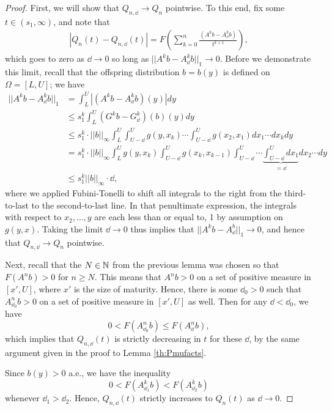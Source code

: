 \begin{proof}
	First, we will show that $Q_{n, \dd} \to Q_n$ pointwise. To this end, fix some $t \in (s_1, \infty)$, and note that
	\begin{align*}
		|Q_n(t) - Q_{n, \dd}(t)| = F \left( \sum_{k=0}^n \frac{(A^k b - A_\dd^k b)}{t^{k + 1}} \right),
	\end{align*}
	which goes to zero  as $\dd \to 0$ so long as $||A^k b - A_\dd^k b||_1 \to 0$. Before we demonstrate this limit, recall that the offspring distribution $b = b(y)$ is defined on $\Omega = [L, U]$; we have
	\begin{align*}
		||A^k b - A_\dd^k b||_1 & = \int_L^U \left| (A^k b - A^k_\dd b)(y) \right| dy \\
		&\leq s_1^k \int_L^U (G^kb - G^k_\dd)(b)(y) dy \\
		&\leq s_1^k \cdot ||b||_\infty \int_L^U \int_{U - \dd}^U g(y, x_k) \cdots \int_{U - \dd}^U g(x_2, x_1) dx_1 \cdots dx_k dy \\
		&= s_1^k \cdot ||b||_\infty \int_L^U g(y, x_k) \int_{U - \dd}^U g(x_k, x_{k - 1}) \int_{U-\dd}^U \cdots \underbrace{\int_{U-\dd}^U dx_1}_{= \dd} dx_2 \cdots dy \\
		&\leq s_1^k ||b||_\infty \cdot \dd,
	\end{align*}
	where we applied Fubini-Tonelli to shift all integrals to the right from the third-to-last to the second-to-last line. In that penultimate expression, the integrals with respect to $x_2, \ldots, y$ are each less than or equal to, 1 by assumption on $g(y, x)$. Taking the limit $\dd \to 0$ thus implies that $||A^kb - A_\dd^b||_1 \to 0$, and hence that $Q_{n, \dd} \to Q_n$ pointwise.
	
	Next, recall that the $N \in \mathbb{N}$ from the previous lemma was chosen so that $F(A^n b) > 0$ for $n \geq N$. This means that $A^n b >0 $ on a set of positive measure in $[x', U]$, where $x'$ is the size of maturity. Hence, there is some $\dd_0>0$ such that $A^n_{\dd_0}b >0$ on a set of positive measure in $[x', U]$ as well. Then for any $\dd < \dd_0$, we have
	\[0 < F(A^n_{\dd_0} b) \leq F(A^n_{\dd} b),\]
	which implies that $Q_{n, \dd}(t)$ is strictly decreasing in $t$ for these $\dd$, by the same argument given in the proof to Lemma \ref{th:Pmufacts}.
	
	Since $b(y) > 0 $ a.e., we have the inequality
	\[0 < F(A_{\dd_1}^k b) < F(A_{\dd_2}^k b)\]
	whenever $\dd_1 > \dd_2$. Hence, $Q_{n, \dd}(t)$ strictly increases to $Q_n(t)$ as $\dd \to 0$.
	

\end{proof}

